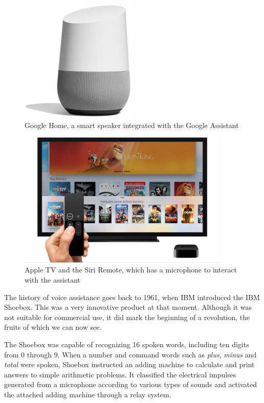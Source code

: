 \begin{figure}
	\centering
	\includegraphics[width=0.5\textwidth]{images/Chapter_03/google-home.png}
	\caption{Google Home, a smart speaker integrated with the Google Assistant}
	\label{fig:google-home}
\end{figure}

\begin{figure}
	\centering
	\includegraphics[width=0.9\textwidth]{images/Chapter_03/apple-tv.jpg}
	\caption{Apple TV and the Siri Remote, which has a microphone to interact with the assistant}
	\label{fig:apple-tv}
\end{figure}

The history of voice assistance goes back to 1961, when IBM introduced the IBM Shoebox.\cite{voicebotTimeline}
This was a very innovative product at that moment. Although it was not suitable for commercial use, it did mark the
beginning of a revolution, the fruits of which we can now see.

The Shoebox was capable of recognizing 16 spoken words, including ten digits from 0 through 9. When a number and
command words such as \textit{plus}, \textit{minus} and \textit{total} were spoken, Shoebox instructed an adding machine
to calculate and print answers to simple arithmetic problems. It classified the electrical impulses generated from a microphone
according to various types of sounds and activated the attached adding machine through a relay system.\cite{ibmArchivesShoebox}

